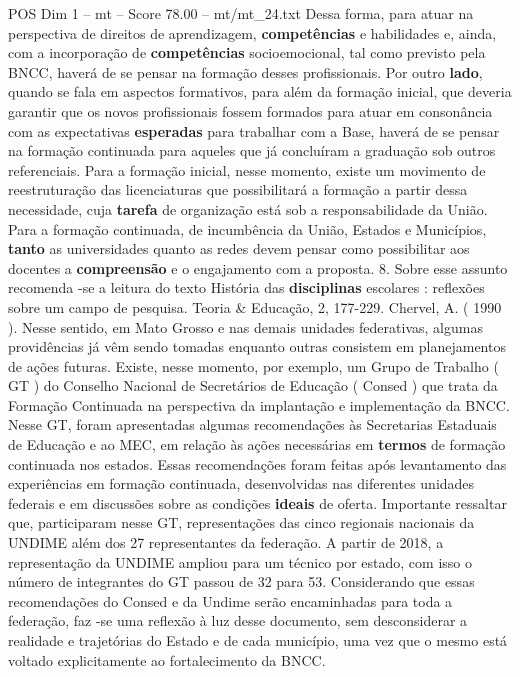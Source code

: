 \begin{textsample}{POS Dim 1 – mt – Score 78.00 – mt/mt\_24.txt}
Dessa forma, para atuar na perspectiva de direitos de aprendizagem, \textbf{competências} e habilidades e, ainda, com a incorporação de \textbf{competências} socioemocional, tal como previsto pela BNCC, haverá de se pensar na formação desses profissionais.
Por outro \textbf{lado}, quando se fala em aspectos formativos, para além da formação inicial, que deveria garantir que os novos profissionais fossem formados para atuar em consonância com as expectativas \textbf{esperadas} para trabalhar com a Base, haverá de se pensar na formação continuada para aqueles que já concluíram a graduação sob outros referenciais.
Para a formação inicial, nesse momento, existe um movimento de reestruturação das licenciaturas que possibilitará a formação a partir dessa necessidade, cuja \textbf{tarefa} de organização está sob a responsabilidade da União.
Para a formação continuada, de incumbência da União, Estados e Municípios, \textbf{tanto} as universidades quanto as redes devem pensar como possibilitar aos docentes a \textbf{compreensão} e o engajamento com a proposta. 8.
Sobre esse assunto recomenda -se a leitura do texto História das \textbf{disciplinas} escolares : reflexões sobre um campo de pesquisa.
Teoria \& Educação, 2, 177-229.
Chervel, A. ( 1990 ).
Nesse sentido, em Mato Grosso e nas demais unidades federativas, algumas providências já vêm sendo tomadas enquanto outras consistem em planejamentos de ações futuras.
Existe, nesse momento, por exemplo, um Grupo de Trabalho ( GT ) do Conselho Nacional de Secretários de Educação ( Consed ) que trata da Formação Continuada na perspectiva da implantação e implementação da BNCC.
Nesse GT, foram apresentadas algumas recomendações às Secretarias Estaduais de Educação e ao MEC, em relação às ações necessárias em \textbf{termos} de formação continuada nos estados.
Essas recomendações foram feitas após levantamento das experiências em formação continuada, desenvolvidas nas diferentes unidades federais e em discussões sobre as condições \textbf{ideais} de oferta.
Importante ressaltar que, participaram nesse GT, representações das cinco regionais nacionais da UNDIME além dos 27 representantes da federação.
A partir de 2018, a representação da UNDIME ampliou para um técnico por estado, com isso o número de integrantes do GT passou de 32 para 53.
Considerando que essas recomendações do Consed e da Undime serão encaminhadas para toda a federação, faz -se uma reflexão à luz desse documento, sem desconsiderar a realidade e trajetórias do Estado e de cada município, uma vez que o mesmo está voltado explicitamente ao fortalecimento da BNCC.

\end{textsample}
